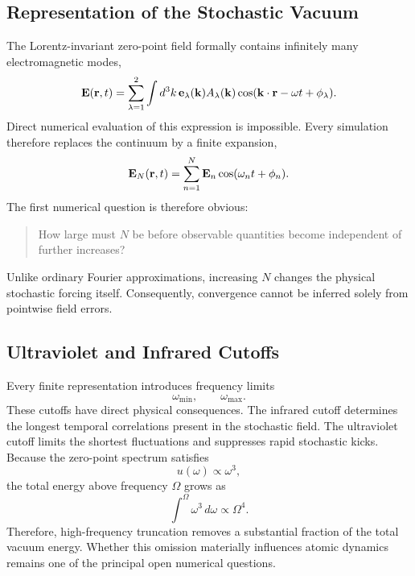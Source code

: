 \subsection{Representation of the Stochastic Vacuum}
The Lorentz-invariant zero-point field formally contains infinitely many
electromagnetic modes,
\begin{equation}
{\bf E}({\bf r},t)=\sum_{\lambda=1}^{2}\int d^3k\,
{\bf e}_\lambda({\bf k})A_\lambda({\bf k})
\cos({\bf k}\cdot{\bf r}-\omega t+\phi_\lambda).
\label{eq:InfiniteField}
\end{equation}
Direct numerical evaluation of this expression is impossible.
Every simulation therefore replaces the continuum by a finite expansion,
\begin{equation}
{\bf E}_N({\bf r},t)=\sum_{n=1}^{N}{\bf E}_n\cos(\omega_nt+\phi_n).
\label{eq:FiniteExpansion}
\end{equation}
The first numerical question is therefore obvious:
\begin{quote}
How large must $N$ be before observable quantities become independent
of further increases?
\end{quote}
Unlike ordinary Fourier approximations, increasing $N$ changes the
physical stochastic forcing itself.
Consequently, convergence cannot be inferred solely from pointwise field
errors.
\subsection{Ultraviolet and Infrared Cutoffs}
Every finite representation introduces frequency limits
\[\omega_{\min},\qquad\omega_{\max}.\]
These cutoffs have direct physical consequences.
The infrared cutoff determines the longest temporal correlations present
in the stochastic field.
The ultraviolet cutoff limits the shortest fluctuations and suppresses
rapid stochastic kicks.
Because the zero-point spectrum satisfies
\[u(\omega)\propto\omega^3,\]
the total energy above frequency $\Omega$ grows as
\begin{equation}
\int^\Omega\omega^3\,d\omega\propto\Omega^4.
\end{equation}
Therefore,
high-frequency truncation removes a substantial fraction of the total
vacuum energy.
Whether this omission materially influences atomic dynamics remains one
of the principal open numerical questions.
